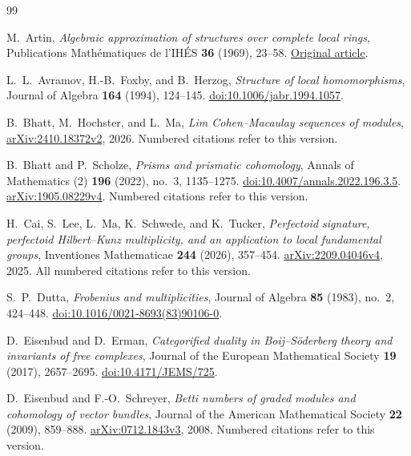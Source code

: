 \begin{thebibliography}{99}

M.~Artin,
\emph{Algebraic approximation of structures over complete local rings},
Publications Math\'ematiques de l'IH\'ES \textbf{36} (1969), 23--58.
\href{https://numdam.org/item/10.1007/BF02684596.pdf}{Original article}.

L.~L.~Avramov, H.-B.~Foxby, and B.~Herzog,
\emph{Structure of local homomorphisms},
Journal of Algebra \textbf{164} (1994), 124--145.
\href{https://doi.org/10.1006/jabr.1994.1057}{doi:10.1006/jabr.1994.1057}.

B.~Bhatt, M.~Hochster, and L.~Ma,
\emph{Lim Cohen--Macaulay sequences of modules},
\href{https://arxiv.org/abs/2410.18372v2}{arXiv:2410.18372v2}, 2026.
Numbered citations refer to this version.

B.~Bhatt and P.~Scholze,
\emph{Prisms and prismatic cohomology},
Annals of Mathematics (2) \textbf{196} (2022), no.~3, 1135--1275.
\href{https://doi.org/10.4007/annals.2022.196.3.5}{doi:10.4007/annals.2022.196.3.5}.
\href{https://arxiv.org/abs/1905.08229v4}{arXiv:1905.08229v4}.
Numbered citations refer to this version.

H.~Cai, S.~Lee, L.~Ma, K.~Schwede, and K.~Tucker,
\emph{Perfectoid signature, perfectoid Hilbert--Kunz multiplicity,
and an application to local fundamental groups},
Inventiones Mathematicae \textbf{244} (2026), 357--454.
\href{https://arxiv.org/abs/2209.04046v4}{arXiv:2209.04046v4}, 2025.
All numbered citations refer to this version.

S.~P.~Dutta,
\emph{Frobenius and multiplicities},
Journal of Algebra \textbf{85} (1983), no.~2, 424--448.
\href{https://doi.org/10.1016/0021-8693(83)90106-0}{doi:10.1016/0021-8693(83)90106-0}.

D.~Eisenbud and D.~Erman,
\emph{Categorified duality in Boij--S\"oderberg theory and invariants
of free complexes},
Journal of the European Mathematical Society \textbf{19} (2017), 2657--2695.
\href{https://doi.org/10.4171/JEMS/725}{doi:10.4171/JEMS/725}.

D.~Eisenbud and F.-O.~Schreyer,
\emph{Betti numbers of graded modules and cohomology of vector bundles},
Journal of the American Mathematical Society \textbf{22} (2009), 859--888.
\href{https://arxiv.org/abs/0712.1843v3}{arXiv:0712.1843v3}, 2008.
Numbered citations refer to this version.


\end{thebibliography}
